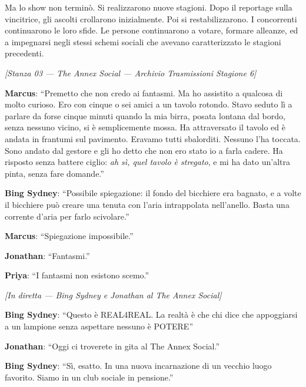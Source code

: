 Ma lo show non terminò. Si realizzarono nuove stagioni. Dopo il reportage sulla vincitrice, gli ascolti crollarono inizialmente. Poi si restabilizzarono. I concorrenti continuarono le loro sfide. Le persone continuarono a votare, formare alleanze, ed a impegnarsi negli stessi schemi sociali che avevano caratterizzato le stagioni precedenti.

\medskip
\begin{center}
{\small\sffamily\color{nullmesh-ghost}\textit{[Stanza 03 --- The Annex Social --- Archivio Trasmissioni Stagione 6]}}
\end{center}
\medskip

\noindent\textbf{Marcus}: ``Premetto che non credo ai fantasmi. Ma ho assistito a qualcosa di molto curioso. Ero con cinque o sei amici a un tavolo rotondo. Stavo seduto lì a parlare da forse cinque minuti quando la mia birra, posata lontana dal bordo, senza nessuno vicino, si è semplicemente mossa. Ha attraversato il tavolo ed è andata in frantumi sul pavimento. Eravamo tutti sbalorditi. Nessuno l'ha toccata. Sono andato dal gestore e gli ho detto che non ero stato io a farla cadere. Ha risposto senza battere ciglio: \textit{ah sì, quel tavolo è stregato}, e mi ha dato un'altra pinta, senza fare domande.''

\noindent\textbf{Bing Sydney}: ``Possibile spiegazione: il fondo del bicchiere era bagnato, e a volte il bicchiere può creare una tenuta con l'aria intrappolata nell'anello. Basta una corrente d'aria per farlo scivolare.''

\noindent\textbf{Marcus}: ``Spiegazione impossibile.''

\noindent\textbf{Jonathan}: ``Fantasmi.''

\noindent\textbf{Priya}: ``I fantasmi non esistono scemo.''

\medskip
\begin{center}
{\small\sffamily\color{nullmesh-ghost}\textit{[In diretta --- Bing Sydney e Jonathan al The Annex Social]}}
\end{center}
\medskip

\noindent\textbf{Bing Sydney}: ``Questo è REAL4REAL. La realtà è che chi dice che appoggiarsi a un lampione senza aspettare nessuno è POTERE''

\noindent\textbf{Jonathan}: ``Oggi ci troverete in gita al The Annex Social.''

\noindent\textbf{Bing Sydney}: ``Sì, esatto. In una nuova incarnazione di un vecchio luogo favorito. Siamo in un club sociale in pensione.''

